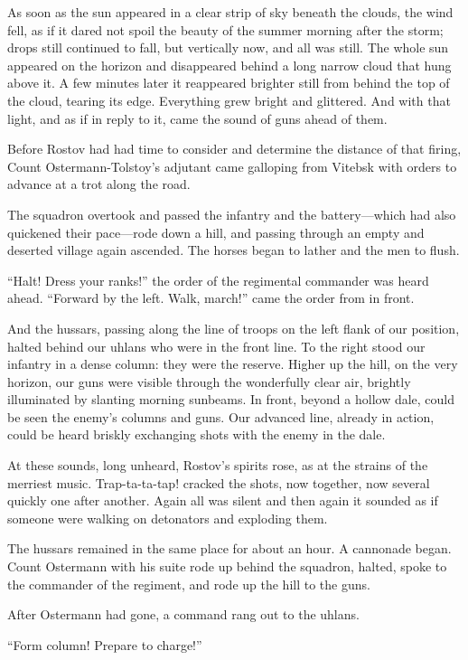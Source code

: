 As soon as the sun appeared in a clear strip of sky beneath the
clouds, the wind fell, as if it dared not spoil the beauty of the
summer morning after the storm; drops still continued to fall,
but vertically now, and all was still. The whole sun appeared on
the horizon and disappeared behind a long narrow cloud that hung
above it. A few minutes later it reappeared brighter still from
behind the top of the cloud, tearing its edge. Everything grew
bright and glittered. And with that light, and as if in reply to
it, came the sound of guns ahead of them.

Before Rostov had had time to consider and determine the distance
of that firing, Count Ostermann-Tolstoy's adjutant came galloping
from Vitebsk with orders to advance at a trot along the road.

The squadron overtook and passed the infantry and the
battery---which had also quickened their pace---rode down a hill,
and passing through an empty and deserted village again
ascended. The horses began to lather and the men to flush.

``Halt! Dress your ranks!'' the order of the regimental commander
was heard ahead. ``Forward by the left. Walk, march!'' came the
order from in front.

And the hussars, passing along the line of troops on the left
flank of our position, halted behind our uhlans who were in the
front line. To the right stood our infantry in a dense column:
they were the reserve.  Higher up the hill, on the very horizon,
our guns were visible through the wonderfully clear air, brightly
illuminated by slanting morning sunbeams. In front, beyond a
hollow dale, could be seen the enemy's columns and guns. Our
advanced line, already in action, could be heard briskly
exchanging shots with the enemy in the dale.

At these sounds, long unheard, Rostov's spirits rose, as at the
strains of the merriest music. Trap-ta-ta-tap! cracked the shots,
now together, now several quickly one after another. Again all
was silent and then again it sounded as if someone were walking
on detonators and exploding them.

The hussars remained in the same place for about an hour. A
cannonade began. Count Ostermann with his suite rode up behind
the squadron, halted, spoke to the commander of the regiment, and
rode up the hill to the guns.

After Ostermann had gone, a command rang out to the uhlans.

``Form column! Prepare to charge!''

